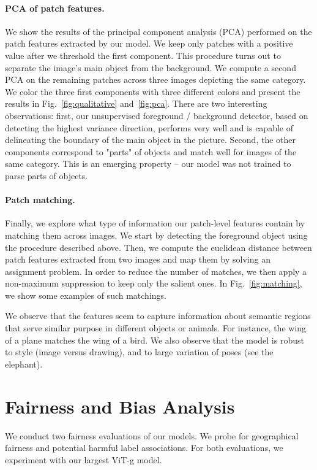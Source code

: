 \paragraph{PCA of patch features.} We show the results of the principal component analysis (PCA) performed on the patch features extracted by our model. We keep only patches with a positive value after we threshold the first component. This procedure turns out to separate the image's main object from the background. We compute a second PCA on the remaining patches across three images depicting the same category. We color the three first components with three different colors and present the results in Fig.~\ref{fig:qualitative} and~\ref{fig:pca}.
There are two interesting observations: first, our unsupervised foreground / background detector, based on detecting the highest variance direction, performs very well and is capable of delineating the boundary of the main object in the picture. Second, the other components correspond to "parts" of objects and match well for images of the same category. This is an emerging property -- our model was not trained to parse parts of objects.

\paragraph{Patch matching.} Finally, we explore what type of information our patch-level features contain by matching them across images. We start by detecting the foreground object using the procedure described above. Then, we compute the euclidean distance between patch features extracted from two images and map them by solving an assignment problem. In order to reduce the number of matches, we then apply a non-maximum suppression to keep only the salient ones. In Fig.~\ref{fig:matching}, we show some examples of such matchings. 

We observe that the features seem to capture information about semantic regions that serve similar purpose in different objects or animals. For instance, the wing of a plane matches the wing of a bird. We also observe that the model is robust to style (image versus drawing), and to large variation of poses (see the elephant).

\section{Fairness and Bias Analysis} We conduct two fairness evaluations of our models. We probe for geographical fairness and potential harmful label associations. For both evaluations, we experiment with our largest ViT-g model.

